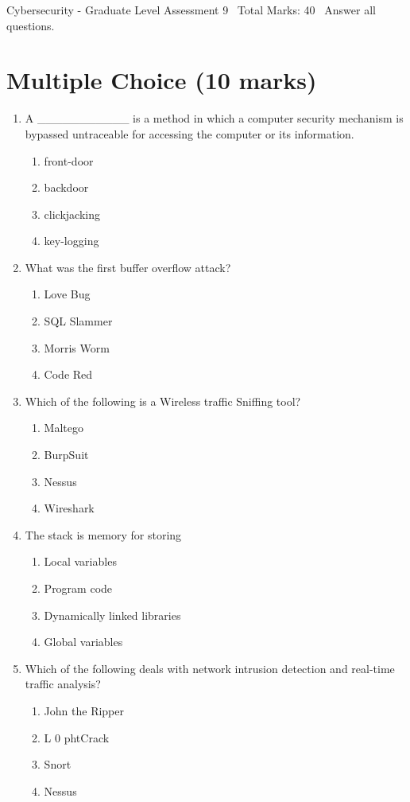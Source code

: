 \documentclass[12pt]{article}
\begin{document}
\begin{center}
Cybersecurity - Graduate Level Assessment 9 \
Total Marks: 40 \
Answer all questions.
\end{center}

\section*{Multiple Choice (10 marks)}
\begin{enumerate}[label=\arabic*.]
\item A \_\_\_\_\_\_\_\_\_\_\_ is a method in which a computer security mechanism is bypassed untraceable for accessing the computer or its information.
\begin{enumerate}[label=(\alph*)]
    \item front-door
    \item backdoor
    \item clickjacking
    \item key-logging
\end{enumerate}
\item What was the first buffer overflow attack?
\begin{enumerate}[label=(\alph*)]
    \item Love Bug
    \item SQL Slammer
    \item Morris Worm
    \item Code Red
\end{enumerate}
\item Which of the following is a Wireless traffic Sniffing tool?
\begin{enumerate}[label=(\alph*)]
    \item Maltego
    \item BurpSuit
    \item Nessus
    \item Wireshark
\end{enumerate}
\item The stack is memory for storing
\begin{enumerate}[label=(\alph*)]
    \item Local variables
    \item Program code
    \item Dynamically linked libraries
    \item Global variables
\end{enumerate}
\item Which of the following deals with network intrusion detection and real-time traffic analysis?
\begin{enumerate}[label=(\alph*)]
    \item John the Ripper
    \item L 0 phtCrack
    \item Snort
    \item Nessus
\end{enumerate}
\end{enumerate}
\end{document}
